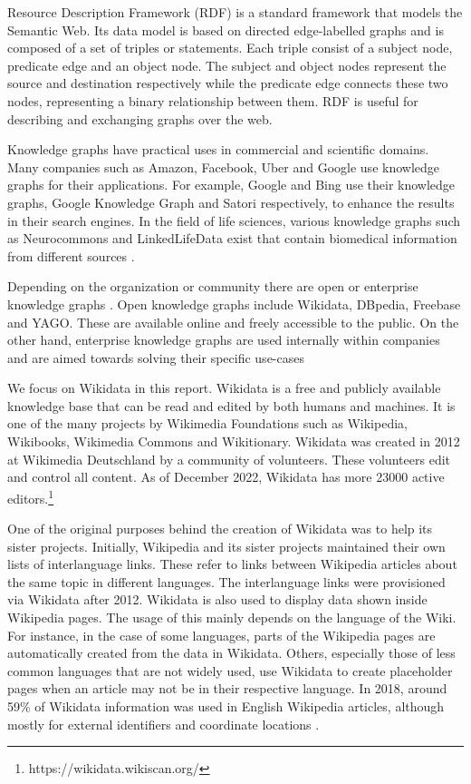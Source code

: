 Resource Description Framework (RDF) \cite{R.Cyganiak2014} is a standard framework that models the Semantic Web. Its data model is based on directed edge-labelled graphs and is composed of a set of triples or statements. Each triple consist of a subject node, predicate edge and an object node. The subject and object nodes represent the source and destination respectively while the predicate edge connects these two nodes, representing a binary relationship between them. RDF is useful for describing and exchanging graphs over the web. 

Knowledge graphs have practical uses in commercial and scientific domains. Many companies such as Amazon, Facebook, Uber and Google use knowledge graphs for their applications. For example, Google and Bing use their knowledge graphs, Google Knowledge Graph and Satori respectively, to enhance the results in their search engines. In the field of life sciences, various knowledge graphs such as Neurocommons and LinkedLifeData exist that contain biomedical information from different sources \cite{Nickel2015}. 

Depending on the organization or community there are open or enterprise knowledge graphs \cite{Hogan2021}. Open knowledge graphs include Wikidata, DBpedia, Freebase and YAGO. These are available online and freely accessible to the public. On the other hand, enterprise knowledge graphs are used internally within companies and are aimed towards solving their specific use-cases

We focus on Wikidata in this report. Wikidata \cite{Foundationa} is a free and publicly available knowledge base that can be read and edited by both humans and machines. It is one of the many projects by Wikimedia Foundations such as Wikipedia, Wikibooks, Wikimedia Commons and Wikitionary. Wikidata was created in 2012 at Wikimedia Deutschland by a community of volunteers. These volunteers edit and control all content. As of December 2022, Wikidata has more 23000 active editors.\footnote{https://wikidata.wikiscan.org/}

One of the original purposes behind the creation of Wikidata was to help its sister projects. Initially, Wikipedia and its sister projects maintained their own lists of interlanguage links. These refer to links between Wikipedia articles about the same topic in different languages. The interlanguage links were provisioned via Wikidata after 2012. Wikidata is also used to display data shown inside Wikipedia pages. The usage of this mainly depends on the language of the Wiki. For instance, in the case of some languages, parts of the Wikipedia pages are automatically created from the data in Wikidata. Others, especially those of less common languages that are not widely used, use Wikidata to create placeholder pages when an article may not be in their respective language. In 2018, around 59\% of Wikidata information was used in English Wikipedia articles, although mostly for external identifiers and coordinate locations \cite{Wikipedia2017}. 

